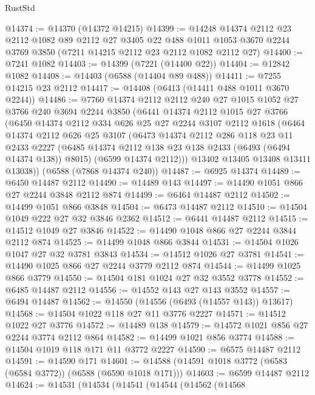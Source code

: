\begin{lexlean}{RustStd}
\begin{coremodule}
@14374 := @14370 (@14372 @14215)
@14399 := @14248
    @14374
    @2112
    @23
    @2112
    @1082
    @89
    @2112
    @27
    @3405
    @22
    @488
    @1011
    @1053
    @3670
    @2244
    @3769
    @3850
    (@7211 @14215 @2112 @23 @2112 @1082 @2112 @27)
@14400 := @7241 @1082
@14403 := @14399 (@7221 (@14400 @22))
@14404 := @12842 @1082
@14408 := @14403 (@6588 (@14404 @89 @488))
@14411 := @7255 @14215 @23 @2112
@14417 := @14408 (@6413 (@14411 @488 @1011 @3670 @2244))
@14486 := @7760
    @14374
    @2112
    @2112
    @240
    @27
    @1015
    @1052
    @27
    @3766
    @240
    @3694
    @2244
    @3850
    (@6441
      @14374
      @2112
      @1015
      @27
      @3766
      (@6450
        @14374
        @2112
        @334
        @626
        @25
        @27
        @2244
        @3107
        @2112
        @1618
        (@6464
          @14374
          @2112
          @626
          @25
          @3107
          (@6473
            @14374
            @2112
            @286
            @118
            @23
            @11
            @2433
            @2227
            (@6485 @14374 @2112 @138 @23 @138 @2433 (@6493 (@6494 @14374 @138)) @8015)
            (@6599 @14374 @2112)))
        @13402
        @13405
        @13408
        @13411
        @13038))
    (@6588 (@7868 @14374 @240))
@14487 := @6925 @14374
@14489 := @6450 @14487 @2112
@14490 := @14489 @143
@14497 := @14490 @1051 @866 @27 @2244 @3848 @2112 @874
@14499 := @6464 @14487 @2112
@14502 := @14499 @1051 @866 @3848
@14504 := @6473 @14487 @2112
@14510 := @14504 @1049 @222 @27 @32 @3846 @2362
@14512 := @6441 @14487 @2112
@14515 := @14512 @1049 @27 @3846
@14522 := @14490 @1048 @866 @27 @2244 @3844 @2112 @874
@14525 := @14499 @1048 @866 @3844
@14531 := @14504 @1026 @1047 @27 @32 @3781 @3843
@14534 := @14512 @1026 @27 @3781
@14541 := @14490 @1025 @866 @27 @2244 @3779 @2112 @874
@14544 := @14499 @1025 @866 @3779
@14550 := @14504 @181 @1024 @27 @32 @3552 @3778
@14552 := @6485 @14487 @2112
@14556 := @14552 @143 @27 @143 @3552
@14557 := @6494 @14487
@14562 := @14550 (@14556 (@6493 (@14557 @143)) @13617)
@14568 := @14504 @1022 @118 @27 @11 @3776 @2227
@14571 := @14512 @1022 @27 @3776
@14572 := @14489 @138
@14579 := @14572 @1021 @856 @27 @2244 @3774 @2112 @864
@14582 := @14499 @1021 @856 @3774
@14588 := @14504 @1019 @118 @171 @11 @3772 @2227
@14590 := @6575 @14487 @2112
@14591 := @14590 @171
@14601 := @14588 (@14591 @1018 @3772 (@6583 (@6584 @3772)) (@6588 (@6590 @1018 @171)))
@14603 := @6599 @14487 @2112
@14624 := @14531
    (@14534
      (@14541
        (@14544
          (@14562
            (@14568

\end{coremodule}
\end{lexlean}

